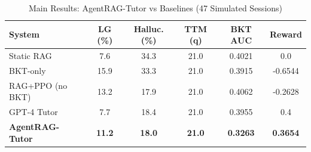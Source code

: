 \begin{table}[htbp]
\centering
\caption{Main Results: AgentRAG-Tutor vs Baselines (47 Simulated Sessions)}
\label{tab:main_results}
\begin{tabular}{lccccc}
\toprule
System & LG (\%) & Halluc. (\%) & TTM (q) & BKT AUC & Reward \\
\midrule
Static RAG & 7.6 & 34.3 & 21.0 & 0.4021 & 0.0 \\
BKT-only & 15.9 & 33.3 & 21.0 & 0.3915 & -0.6544 \\
RAG+PPO (no BKT) & 13.2 & 17.9 & 21.0 & 0.4062 & -0.2628 \\
GPT-4 Tutor & 7.7 & 18.4 & 21.0 & 0.3955 & 0.4 \\
\textbf{AgentRAG-Tutor} & \textbf{11.2} & \textbf{18.0} & \textbf{21.0} & \textbf{0.3263} & \textbf{0.3654} \\
\bottomrule
\end{tabular}
\end{table}
